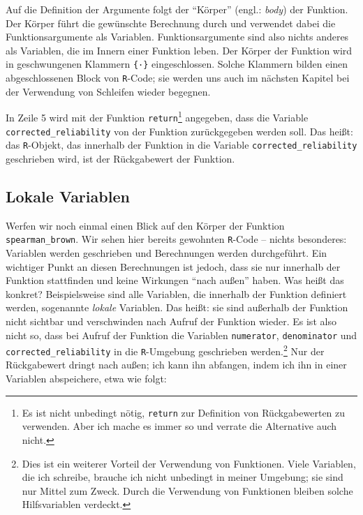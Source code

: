 \documentclass[12pt,]{tufte-book}
\theoremstyle{definition}
\theoremstyle{definition}
\theoremstyle{definition}
\theoremstyle{remark}
\begin{document}
Auf die Definition der Argumente folgt der ``Körper'' (engl.:
\emph{body}) der Funktion. Der Körper führt die gewünschte Berechnung
durch und verwendet dabei die Funktionsargumente als Variablen.
Funktionsargumente sind also nichts anderes als Variablen, die im Innern
einer Funktion leben. Der Körper der Funktion wird in geschwungenen
Klammern \texttt{\{·\}} eingeschlossen. Solche Klammern bilden einen
abgeschlossenen Block von \texttt{R}-Code; sie werden uns auch im
nächsten Kapitel bei der Verwendung von Schleifen wieder begegnen.

In Zeile 5 wird mit der Funktion \texttt{return}\footnote{Es ist nicht
  unbedingt nötig, \texttt{return} zur Definition von Rückgabewerten zu
  verwenden. Aber ich mache es immer so und verrate die Alternative auch
  nicht.} angegeben, dass die Variable \texttt{corrected\_reliability}
von der Funktion zurückgegeben werden soll. Das heißt: das
\texttt{R}-Objekt, das innerhalb der Funktion in die Variable
\texttt{corrected\_reliability} geschrieben wird, ist der Rückgabewert
der Funktion.

\subsection{Lokale Variablen}\label{lokale-variablen}

Werfen wir noch einmal einen Blick auf den Körper der Funktion
\texttt{spearman\_brown}. Wir sehen hier bereits gewohnten
\texttt{R}-Code -- nichts besonderes: Variablen werden geschrieben und
Berechnungen werden durchgeführt. Ein wichtiger Punkt an diesen
Berechnungen ist jedoch, dass sie nur innerhalb der Funktion stattfinden
und keine Wirkungen ``nach außen'' haben. Was heißt das konkret?
Beispielsweise sind alle Variablen, die innerhalb der Funktion definiert
werden, sogenannte \emph{lokale} Variablen. Das heißt: sie sind
außerhalb der Funktion nicht sichtbar und verschwinden nach Aufruf der
Funktion wieder. Es ist also nicht so, dass bei Aufruf der Funktion die
Variablen \texttt{numerator}, \texttt{denominator} und
\texttt{corrected\_reliability} in die \texttt{R}-Umgebung geschrieben
werden.\footnote{Dies ist ein weiterer Vorteil der Verwendung von
  Funktionen. Viele Variablen, die ich schreibe, brauche ich nicht
  unbedingt in meiner Umgebung; sie sind nur Mittel zum Zweck. Durch die
  Verwendung von Funktionen bleiben solche Hilfsvariablen verdeckt.} Nur
der Rückgabewert dringt nach außen; ich kann ihn abfangen, indem ich ihn
in einer Variablen abspeichere, etwa wie folgt:
\end{document}
